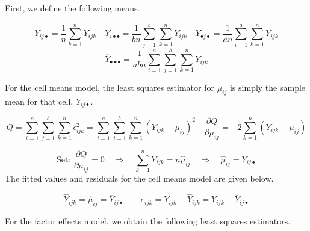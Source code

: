 \documentclass[
]{book}
\begin{document}
First, we define the following means.

\[
\overline{Y}_{ij\bullet} = \frac{1}{n}\sum_{k=1}^nY_{ijk} \quad
\overline{Y}_{i\bullet\bullet} = 
\frac{1}{bn}\sum_{j=1}^b\sum_{k=1}^nY_{ijk} \quad
\overline{Y}_{\bullet j \bullet} = 
\frac{1}{an}\sum_{i=1}^a\sum_{k=1}^nY_{ijk} 
\] \[
\overline{Y}_{\bullet \bullet \bullet} = 
\frac{1}{abn}\sum_{i=1}^a\sum_{j=1}^b\sum_{k=1}^nY_{ijk}
\]

For the cell means model, the least squares estimator for \(\mu_{ij}\)
is simply the sample mean for that cell, \(\overline{Y}_{ij\bullet}\).

\[
Q=\sum_{i=1}^a\sum_{j=1}^b\sum_{k=1}^n\epsilon_{ijk}^2 =
\sum_{i=1}^a\sum_{j=1}^b\sum_{k=1}^n\left(Y_{ijk}-\mu_{ij}\right)^2
\quad
\frac{\partial Q}{\partial \mu_{ij}}=
-2\sum_{k=1}^n\left(Y_{ijk}-\mu_{ij}\right)\]

\[\mbox{Set: }
\frac{\partial Q}{\partial \mu_{ij}}=0
\quad \Rightarrow \quad
\sum_{k=1}^nY_{ijk}=n\hat{\mu}_{ij}
\quad \Rightarrow \quad
\hat{\mu}_{ij}=\overline{Y}_{ij\bullet}
\] The fitted values and residuals for the cell means model are given
below.

\[
\hat{Y}_{ijk}=\hat{\mu}_{ij}=\overline{Y}_{ij\bullet}
\qquad
e_{ijk}=Y_{ijk}-\hat{Y}_{ijk} = Y_{ijk}-\overline{Y}_{ij\bullet}
\]

For the factor effects model, we obtain the following least squares
estimators.
\end{document}
